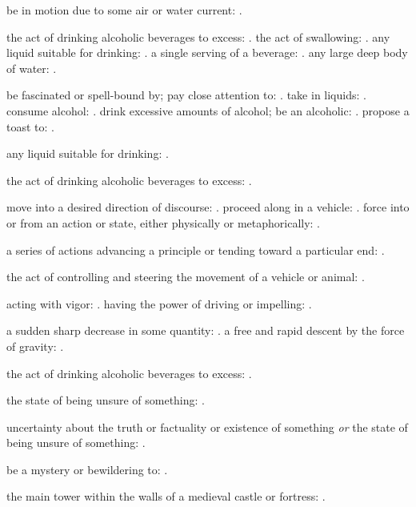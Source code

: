   be in motion due to some air or water current: .

  the act of drinking alcoholic beverages to excess: . the act of swallowing: . any liquid suitable for drinking: . a single serving of a beverage: . any large deep body of water: .

  be fascinated or spell-bound by; pay close attention to: . take in liquids: . consume alcohol: . drink excessive amounts of alcohol; be an alcoholic: . propose a toast to: .

  any liquid suitable for drinking: .

  the act of drinking alcoholic beverages to excess: .

  move into a desired direction of discourse: . proceed along in a vehicle: . force into or from an action or state, either physically or metaphorically: .

  a series of actions advancing a principle or tending toward a particular end: .

  the act of controlling and steering the movement of a vehicle or animal: .

  acting with vigor: . having the power of driving or impelling: .

  a sudden sharp decrease in some quantity: . a free and rapid descent by the force of gravity: .

  the act of drinking alcoholic beverages to excess: .

  the state of being unsure of something: .

  uncertainty about the truth or factuality or existence of something \textit{or} the state of being unsure of something: .

  be a mystery or bewildering to: .

  the main tower within the walls of a medieval castle or fortress: .


